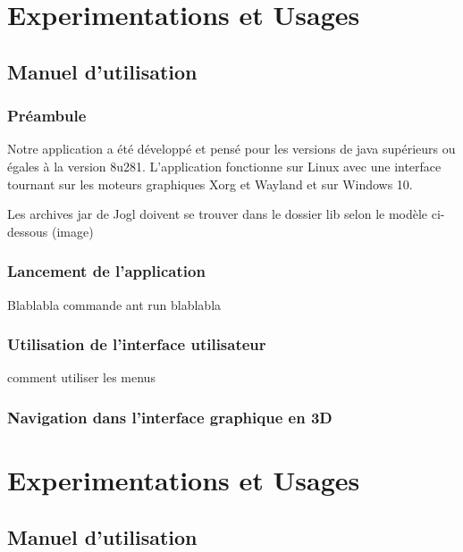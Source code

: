 \chapter{Experimentations et Usages}

\section{Manuel d'utilisation}

\subsection{Préambule}
Notre application a été développé et pensé pour les versions de java supérieurs ou égales à la version 8u281.
L'application fonctionne sur Linux avec une interface tournant sur les moteurs graphiques Xorg et Wayland et sur Windows 10.

Les archives jar de Jogl doivent se trouver dans le dossier lib selon le modèle ci-dessous (image)


\subsection{Lancement de l'application}

Blablabla commande ant run blablabla

\subsection{Utilisation de l'interface utilisateur}

comment utiliser les menus

\subsection{Navigation dans l'interface graphique en 3D}

\chapter{Experimentations et Usages}

\section{Manuel d'utilisation}

